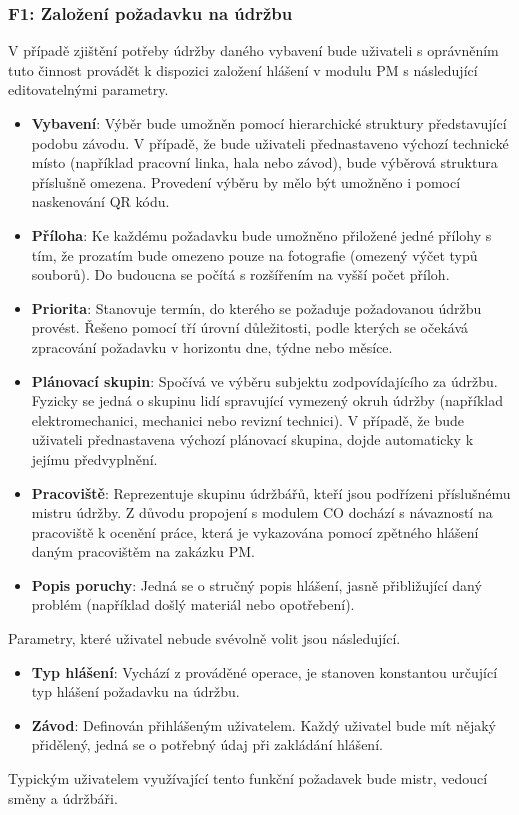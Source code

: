 \documentclass[thesis=M,czech]{FITthesis}[2012/06/26]
\begin{document}
\subsubsection{F1: Založení požadavku na údržbu}
\label{sssec:fc_zalozeni_pozadavku}
V případě zjištění potřeby údržby daného vybavení bude uživateli s oprávněním tuto činnost provádět k dispozici založení hlášení v modulu PM s následující editovatelnými parametry.
\begin{itemize}
	\item
	\textbf{Vybavení}: Výběr bude umožněn pomocí hierarchické struktury představující podobu závodu. V případě, že bude uživateli přednastaveno výchozí technické místo (například pracovní linka, hala nebo závod), bude výběrová struktura příslušně omezena. Provedení výběru by mělo být umožněno i pomocí naskenování QR kódu.  
	\item
	\textbf{Příloha}: Ke každému požadavku bude umožněno přiložené jedné přílohy s tím, že prozatím bude omezeno pouze na fotografie (omezený výčet typů souborů). Do budoucna se počítá s rozšířením na vyšší počet příloh.  
	\item
	\textbf{Priorita}: Stanovuje termín, do kterého se požaduje požadovanou údržbu provést. Řešeno pomocí tří úrovní důležitosti, podle kterých se očekává zpracování požadavku v horizontu dne, týdne nebo měsíce.
	\item
	\textbf{Plánovací skupin}: Spočívá ve výběru subjektu zodpovídajícího za údržbu. Fyzicky se jedná o skupinu lidí spravující vymezený okruh údržby (například elektromechanici, mechanici nebo revizní technici). V případě, že bude uživateli přednastavena výchozí plánovací skupina, dojde automaticky k jejímu předvyplnění.
	\item
	\textbf{Pracoviště}: Reprezentuje skupinu údržbářů, kteří jsou podřízeni příslušnému mistru údržby. Z důvodu propojení s modulem CO dochází s návazností na pracoviště k ocenění práce, která je vykazována pomocí zpětného hlášení daným pracovištěm na zakázku PM. 
	\item
	\textbf{Popis poruchy}: Jedná se o stručný popis hlášení, jasně přibližující daný problém (například došlý materiál nebo opotřebení). 
\end{itemize} 
Parametry, které uživatel nebude svévolně volit jsou následující.
\begin{itemize}
	\item
	\textbf{Typ hlášení}: Vychází z prováděné operace, je stanoven konstantou určující typ hlášení požadavku na údržbu.
	\item
	\textbf{Závod}: Definován přihlášeným uživatelem. Každý uživatel bude mít nějaký přidělený, jedná se o potřebný údaj při zakládání hlášení.
\end{itemize} 
Typickým uživatelem využívající tento funkční požadavek bude mistr, vedoucí směny a údržbáři.
\end{document}
